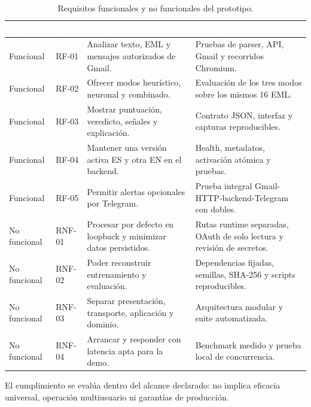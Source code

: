 \documentclass[11pt,a4paper,oneside]{report}
\begin{document}
\begingroup
\begin{table}[H]
  \centering
  \small
  \caption{Requisitos funcionales y no funcionales del prototipo.}
  \label{tab:5-1}
  \begin{tabularx}{\textwidth}{|X|X|X|X|}
    \hline
    \rowcolor{uemcgreen}
    \textcolor{white}{\textbf{Tipo}} & \textcolor{white}{\textbf{ID}} & \textcolor{white}{\textbf{Requisito}} & \textcolor{white}{\textbf{Verificación}} \\
    \hline
    Funcional & RF-01 & Analizar texto, EML y mensajes autorizados de Gmail. & Pruebas de parser, API, Gmail y recorridos Chromium. \\
    \hline
    \rowcolor{tablelight}
    Funcional & RF-02 & Ofrecer modos heurístico, neuronal y combinado. & Evaluación de los tres modos sobre los mismos 16 EML. \\
    \hline
    Funcional & RF-03 & Mostrar puntuación, veredicto, señales y explicación. & Contrato JSON, interfaz y capturas reproducibles. \\
    \hline
    \rowcolor{tablelight}
    Funcional & RF-04 & Mantener una versión activa ES y otra EN en el backend. & Health, metadatos, activación atómica y pruebas. \\
    \hline
    Funcional & RF-05 & Permitir alertas opcionales por Telegram. & Prueba integral Gmail-HTTP-backend-Telegram con dobles. \\
    \hline
    \rowcolor{tablelight}
    No funcional & RNF-01 & Procesar por defecto en loopback y minimizar datos persistidos. & Rutas runtime separadas, OAuth de solo lectura y revisión de secretos. \\
    \hline
    No funcional & RNF-02 & Poder reconstruir entrenamiento y evaluación. & Dependencias fijadas, semillas, SHA-256 y scripts reproducibles. \\
    \hline
    \rowcolor{tablelight}
    No funcional & RNF-03 & Separar presentación, transporte, aplicación y dominio. & Arquitectura modular y suite automatizada. \\
    \hline
    No funcional & RNF-04 & Arrancar y responder con latencia apta para la demo. & Benchmark medido y prueba local de concurrencia. \\
    \hline
  \end{tabularx}
\end{table}
\endgroup

El cumplimiento se evalúa dentro del alcance declarado: no implica eficacia universal, operación multiusuario ni garantías de producción.
\end{document}

